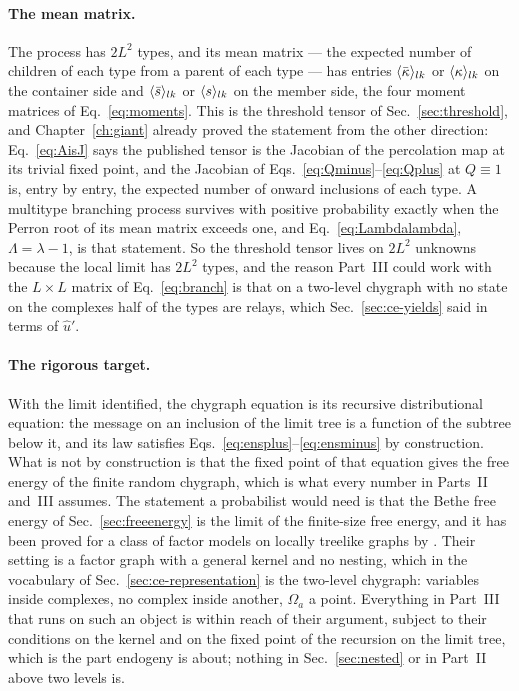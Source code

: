 \paragraph{The mean matrix.} The process has $2L^{2}$ types, and its mean
matrix --- the expected number of children of each type from a parent of
each type --- has entries $\langle \bar\kappa \rangle_{lk}$ or $\langle \kappa \rangle_{lk}$ on the
container side and $\langle \bar s \rangle_{lk}$ or $\langle s \rangle_{lk}$ on the member side,
the four moment matrices of Eq.~\eqref{eq:moments}. This is the threshold
tensor of Sec.~\ref{sec:threshold}, and Chapter~\ref{ch:giant} already
proved the statement from the other direction: Eq.~\eqref{eq:AisJ} says the
published tensor is the Jacobian of the percolation map at its trivial
fixed point, and the Jacobian of Eqs.~\eqref{eq:Qminus}--\eqref{eq:Qplus}
at $Q\equiv1$ is, entry by entry, the expected number of onward inclusions
of each type. A multitype branching process survives with positive
probability exactly when the Perron root of its mean matrix exceeds one,
and Eq.~\eqref{eq:Lambdalambda}, $\Lambda=\lambda-1$, is that statement.
So the threshold tensor lives on $2L^{2}$ unknowns because the local limit
has $2L^{2}$ types, and the reason Part~III could work with the $L\times L$
matrix of Eq.~\eqref{eq:branch} is that on a two-level chygraph with no
state on the complexes half of the types are relays, which
Sec.~\ref{sec:ce-yields} said in terms of $\hat u'$.

\paragraph{The rigorous target.} With the limit identified, the chygraph
equation is its recursive distributional equation: the message on an
inclusion of the limit tree is a function of the subtree below it, and its
law satisfies Eqs.~\eqref{eq:ensplus}--\eqref{eq:ensminus} by construction.
What is not by construction is that the fixed point of that equation gives
the free energy of the finite random chygraph, which is what every number in
Parts~II and~III assumes. The statement a probabilist would need is that
the Bethe free energy of Sec.~\ref{sec:freeenergy} is the limit of the
finite-size free energy, and it has been proved for a class of factor
models on locally treelike graphs by \citet{dembo2013}. Their setting is a
factor graph with a general kernel and no nesting, which in the vocabulary
of Sec.~\ref{sec:ce-representation} is the two-level chygraph: variables
inside complexes, no complex inside another, $\Omega_{a}$ a point.
Everything in Part~III that runs on such an object is within reach of
their argument, subject to their conditions on the kernel and on the fixed
point of the recursion on the limit tree, which is the part endogeny is
about; nothing in
Sec.~\ref{sec:nested} or in Part~II above two levels is.

